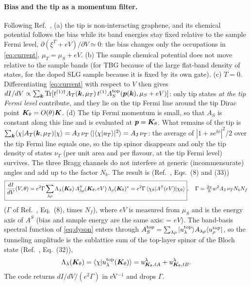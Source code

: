 \paragraph{Bias and the tip as a momentum filter.} Following Ref.~\cite{Wei2025}, (a) the tip is non-interacting
graphene, and its chemical potential follows the bias while its band energies stay fixed relative to the sample
Fermi level, $\partial(\xi^T+eV)/\partial V\simeq0$: the bias changes only the occupations in \cref{eq:current},
$\mu_T=\mu_S+eV$. (b) The sample chemical potential does not move relative to the sample bands (for TBG because
of the large flat-band density of states, for the doped SLG sample because it is fixed by its own gate).
(c) $T=0$. Differentiating \cref{eq:current} with respect to $V$ then gives
$dI/dV\propto\sum_{\bm k}\operatorname{Tr}[t^{(1)\dagger}A_T(\bm k,\mu_T)\,t^{(1)}A^{\rm top}_S(\bm p(\bm k),\mu_S+eV)]$: only tip states \emph{at the
tip Fermi level} contribute, and they lie on the tip Fermi line around the tip Dirac point
$\bm K_\theta=O(\theta)\bm K$. (d) The tip Fermi momentum is small, so that $A_S$ is constant along this line and is
evaluated at $\bm p=\bm K_\theta$. What remains of the tip is
$\sum_{\bm k}\langle \chi| A_T(\bm k,\mu_T)|\chi\rangle=A_{\rm J}\,\nu_T\,\langle|\langle \chi|u_T\rangle|^2\rangle=A_{\rm J}\,\nu_T$: the average of
$|1+se^{\ii\phi}|^2/2$ over the tip Fermi line equals one, so the tip spinor disappears and only the tip density of
states $\nu_T$ (per unit area and per flavour, at the tip Fermi level) survives. The three Bragg channels do not interfere at generic (incommensurate) angles and add up
to the factor $N_b$. The result is (Ref.~\cite{Wei2025}, Eqs.~(8) and (33))
\begin{equation}
\boxed{\frac{dI}{dV}(V,\theta)=e^2\Gamma\sum_{\lambda\rho}\Lambda_\lambda(\bm K_\theta)\,
A^S_{\lambda\rho}(\bm K_\theta,eV)\,\Lambda_\rho(\bm K_\theta)^*
=e^2\Gamma\,\langle \chi_\theta|A^S(eV)|\chi_\theta\rangle},
\quad \Gamma=\tfrac{2\pi}{\hbar}w^2A_{\rm J}\,\nu_TN_bN_f
\label{eq:didv}
\end{equation}
($\Gamma$ of Ref.~\cite{Wei2025}, Eq.~(8), times $N_f$), where $eV$ is measured from $\mu_S$ and is the energy axis of $A^S$ (bias and
sample energy are the same axis:  = $eV$). The band-basis spectral function of
\cref{eq:dyson} enters through $A^{\rm top}_S=\sum_{\lambda\rho}|u^{\rm top}_\lambda\rangle A_{\lambda\rho}\langle u^{\rm top}_\rho|$,
so the tunneling amplitude is the sublattice sum of the top-layer spinor of the Bloch state (Ref.~\cite{Wei2025}, Eq.~(32)),
\begin{equation}
\Lambda_\lambda(\bm K_\theta)=\langle \chi|u^{\rm top}_{\lambda}(\bm K_\theta)\rangle=u^\lambda_{\bm K_\theta,tA}+u^\lambda_{\bm K_\theta,tB}.
\label{eq:Lambda}
\end{equation}
The code returns $dI/dV/(e^2\Gamma)$ in eV$^{-1}$ and drops $\Gamma$.


